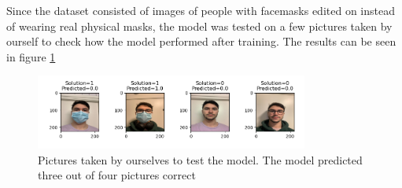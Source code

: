 \documentclass[../main.tex]{subfiles}
\begin{document}
Since the dataset consisted of images of people with facemasks edited on instead of wearing real physical masks, the model was tested on a few pictures taken by ourself to check how the model performed after training. The results can be seen in figure \ref{fig:logreg_real_pics}

\begin{figure}[H]
    \centering
    \includegraphics[width=0.8\textwidth]{doc/assets/log_reg_real_pics.png}
    \caption{Pictures taken by ourselves to test the model. The model predicted three out of four pictures correct}
    \label{fig:logreg_real_pics}
\end{figure}
\end{document}
